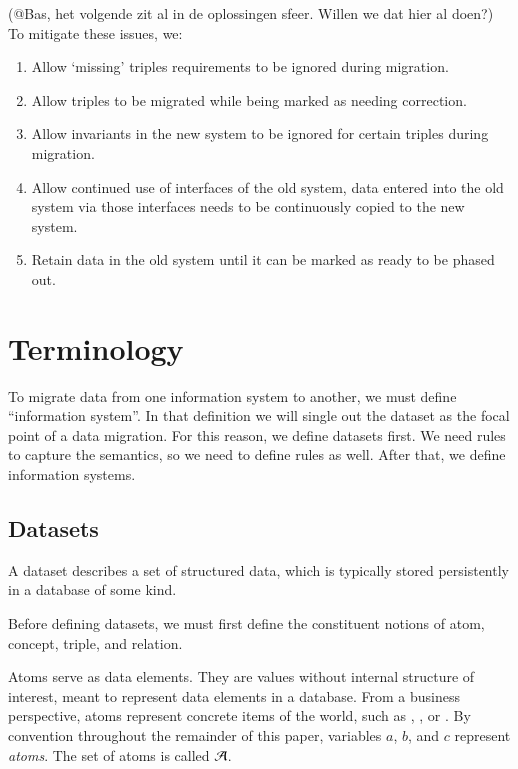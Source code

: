 \documentclass{elsarticle}
\begin{document}
(@Bas, het volgende zit al in de oplossingen sfeer. Willen we dat hier al doen?)
   To mitigate these issues, we:
   
   \begin{enumerate}
   \item Allow `missing' triples requirements to be ignored during migration.
   \item Allow triples to be migrated while being marked as needing correction.
   \item Allow invariants in the new system to be ignored for certain triples during migration.
   \item Allow continued use of interfaces of the old system, data entered into the old system via those interfaces needs to be continuously copied to the new system.
   \item Retain data in the old system until it can be marked as ready to be phased out.
   \end{enumerate}   

\section{Terminology}
\label{sct:Terminology}
   To migrate data from one information system to another,
   we must define ``information system''.
   In that definition we will single out the dataset as the focal point of a data migration.
   For this reason, we define datasets first.
   We need rules to capture the semantics, so we need to define rules as well.
   After that, we define information systems.

\subsection{Datasets}
\label{sct:Datasets}
   A dataset describes a set of structured data, which is typically stored persistently in a database of some kind.

   Before defining datasets, we must first define the constituent notions of atom, concept, triple, and relation.
   
   Atoms serve as data elements.
   They are values without internal structure of interest, meant to represent data elements in a database.
   From a business perspective, atoms represent concrete items of the world,
   such as , , or .
   By convention throughout the remainder of this paper, variables $a$, $b$, and $c$ represent \emph{atoms}.
   The set of atoms is called $\mathcal{A}$.
   
\end{document}

